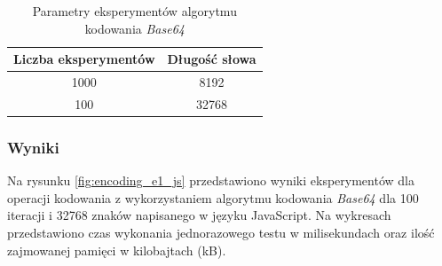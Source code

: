 \begin{table}[H]
  \centering
  \caption{Parametry eksperymentów algorytmu kodowania \textit{Base64}}
  \begin{tabular}{|c|c|}
    \hline
    \textbf{Liczba eksperymentów} & \textbf{Długość słowa}\\ \hline
    1000 & 8192 \\ \hline
    100 & 32768 \\ \hline
  \end{tabular}
  \label{tab:encoding_experiments}
\end{table}

\subsubsection{Wyniki}
Na rysunku \ref{fig:encoding_e1_js} przedstawiono wyniki eksperymentów dla operacji kodowania z wykorzystaniem algorytmu kodowania \textit{Base64} dla 100 iteracji i 32768 znaków napisanego w języku JavaScript. Na wykresach przedstawiono czas wykonania jednorazowego testu w milisekundach oraz ilość zajmowanej pamięci w kilobajtach (kB).

